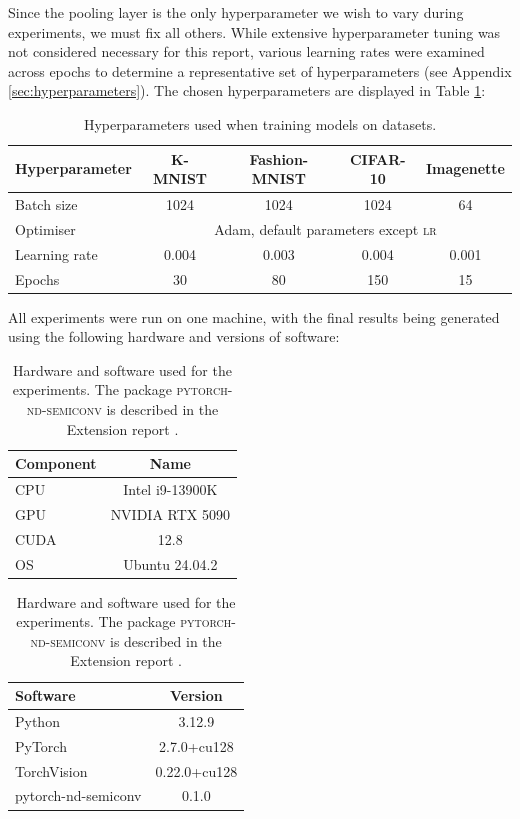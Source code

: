 \documentclass[a4paper, 12pt]{report}
\begin{document}
Since the pooling layer is the only hyperparameter we wish to vary during experiments, we must fix all others. While extensive hyperparameter tuning was not considered necessary for this report, various learning rates were examined across epochs to determine a representative set of hyperparameters (see Appendix \ref{sec:hyperparameters}). The chosen hyperparameters are displayed in Table \ref{table:hyperparameters}:

\begin{table}[!htbp]
\centering
\begin{tabular}{l|*4c}
\toprule
Hyperparameter & K-MNIST & Fashion-MNIST & CIFAR-10 & Imagenette\\
\midrule
Batch size & 1024 & 1024 & 1024 & 64\\
Optimiser   &  \multicolumn{4}{c}{Adam, default parameters except \textsc{lr}} \\
Learning rate & 0.004 & 0.003 & 0.004 & 0.001 \\
Epochs & 30 & 80 & 150 & 15 \\
\bottomrule
\end{tabular}
\caption{Hyperparameters used when training models on datasets.}
\label{table:hyperparameters}
\end{table}
\noindent
All experiments were run on one machine, with the final results being generated using the following hardware and versions of software:

\begin{table}[!htbp]
\centering
\begin{tabular}{l|c}
\toprule
Component & Name \\
\midrule
CPU & Intel i9-13900K \\
GPU & NVIDIA RTX 5090 \\
CUDA & 12.8\\
OS & Ubuntu 24.04.2\\
\bottomrule
\end{tabular}
\quad
\begin{tabular}{l|c}
\toprule
Software & Version \\
\midrule
Python & 3.12.9 \\
PyTorch & 2.7.0+cu128 \\
TorchVision & 0.22.0+cu128 \\
\small pytorch-nd-semiconv & 0.1.0 \\
\bottomrule
\end{tabular}

\caption{Hardware and software used for the experiments. The package \textsc{pytorch-nd-semiconv} is described in the Extension report \cite{extension}.}
\vspace{-0.3cm}
\end{table}
\end{document}
